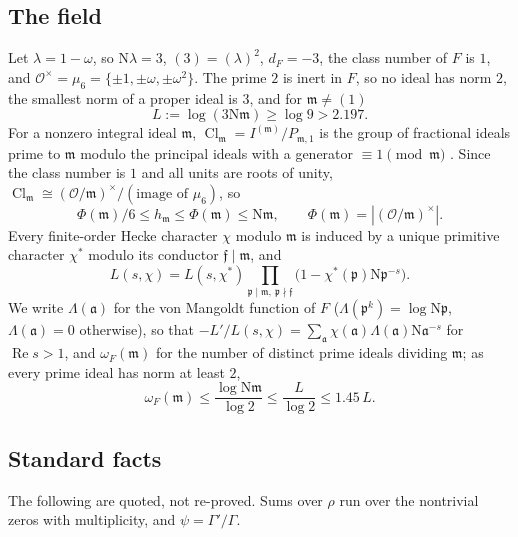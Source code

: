 \documentclass[11pt]{article}
\theoremstyle{definition}
\theoremstyle{remark}
\numberwithin{equation}{section}
\newcommand{\cO}{\mathcal O}
\newcommand{\fa}{\mathfrak a}
\newcommand{\fp}{\mathfrak p}
\newcommand{\fm}{\mathfrak m}
\newcommand{\ff}{\mathfrak f}
\newcommand{\Nm}{\mathrm N}
\newcommand{\Cl}{\operatorname{Cl}}
\newcommand{\Rea}{\operatorname{Re}}
\begin{document}
\subsection{The field}\label{sec:field}
Let $\lambda=1-\omega$, so $\Nm\lambda=3$, $(3)=(\lambda)^2$, $d_F=-3$, the class number of $F$ is $1$, and $\cO^\times=\mu_6=\{\pm1,\pm\omega,\pm\omega^2\}$. The prime $2$ is inert in $F$, so no ideal has norm $2$, the smallest norm of a proper ideal is $3$, and for $\fm\ne(1)$
\begin{equation}\label{eq:L}
 L:=\log(3\Nm\fm)\ge\log9>2.197 .
\end{equation}
For a nonzero integral ideal $\fm$, $\Cl_\fm=I^{(\fm)}/P_{\fm,1}$ is the group of fractional ideals prime to $\fm$ modulo the principal ideals with a generator $\equiv1\pmod{\fm}$ \cite[Chapter~VI, \S1]{neukirch1999}. Since the class number is $1$ and all units are roots of unity, $\Cl_\fm\cong(\cO/\fm)^\times/(\text{image of }\mu_6)$, so
\begin{equation}\label{eq:hm}
 \Phi(\fm)/6\le h_\fm\le\Phi(\fm)\le\Nm\fm,\qquad\Phi(\fm)=|(\cO/\fm)^\times| .
\end{equation}
Every finite-order Hecke character $\chi$ modulo $\fm$ is induced by a unique primitive character $\chi^*$ modulo its conductor $\ff\mid\fm$, and
\begin{equation}\label{eq:induced}
 L(s,\chi)=L(s,\chi^*)\prod_{\fp\mid\fm,\ \fp\nmid\ff}\bigl(1-\chi^*(\fp)\Nm\fp^{-s}\bigr).
\end{equation}
We write $\Lambda(\fa)$ for the von Mangoldt function of $F$ ($\Lambda(\fp^k)=\log\Nm\fp$, $\Lambda(\fa)=0$ otherwise), so that $-L'/L(s,\chi)=\sum_\fa\chi(\fa)\Lambda(\fa)\Nm\fa^{-s}$ for $\Rea s>1$, and $\omega_F(\fm)$ for the number of distinct prime ideals dividing $\fm$; as every prime ideal has norm at least $2$,
\begin{equation}\label{eq:omega}
 \omega_F(\fm)\le\frac{\log\Nm\fm}{\log2}\le\frac{L}{\log2}\le1.45\,L .
\end{equation}

\subsection{Standard facts}\label{sec:standard}
The following are quoted, not re-proved. Sums over $\rho$ run over the nontrivial zeros with multiplicity, and $\psi=\Gamma'/\Gamma$.
\end{document}
